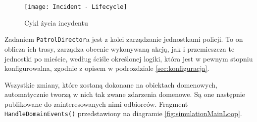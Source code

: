 \begin{figure}
    \centering
    \texttt{[image: Incident - Lifecycle]}
    \caption{Cykl życia incydentu}
    \label{fig:simulationIncidentLifecycle}
\end{figure}

\par Zadaniem \texttt{PatrolDirector}a jest z kolei zarządzanie jednostkami policji. To on oblicza ich trasy, zarządza obecnie wykonywaną akcją, jak i przemieszcza te jednostki po mieście, według ściśle określonej logiki, która jest w pewnym stopniu konfigurowalna, zgodnie z opisem w podrozdziale \ref{sec:konfiguracja}.

\par Wszystkie zmiany, które zostaną dokonane na obiektach domenowych, automatycznie tworzą w nich tak zwane zdarzenia domenowe. Są one następnie publikowane do zainteresowanych nimi odbiorców. Fragment \texttt{HandleDomainEvents()} przedstawiony na diagramie \ref{fig:simulationMainLoop}.